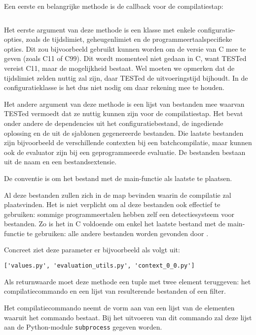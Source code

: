 Een eerste en belangrijke methode is de callback voor de compilatiestap:

\inputminted[firstline=11,lastline=16,gobble=4]{python}{sources/c-config.py}

Het eerste argument van deze methode is een klasse met enkele configuratie-opties, zoals de tijdslimiet, geheugenlimiet en de programmeertaalspecifieke opties.
Dit zou bijvoorbeeld gebruikt kunnen worden om de versie van C mee te geven (zoals C11 of C99).
Dit wordt momenteel niet gedaan in C, want TESTed vereist C11, maar de mogelijkheid bestaat.
Wel moeten we opmerken dat de tijdslimiet zelden nuttig zal zijn, daar TESTed de uitvoeringstijd bijhoudt.
In de configuratieklasse is het dus niet nodig om daar rekening mee te houden.

Het andere argument van deze methode is een lijst van bestanden mee waarvan TESTed vermoedt dat ze nuttig kunnen zijn voor de compilatiestap.
Het bevat onder andere de dependencies uit het configuratiebestand, de ingediende oplossing en de uit de sjablonen gegenereerde bestanden.
Die laatste bestanden zijn bijvoorbeeld de verschillende contexten bij een batchcompilatie, maar kunnen ook de evaluator zijn bij een geprogrammeerde evaluatie.
De bestanden bestaan uit de naam en een bestandsextensie.

De conventie is om het bestand met de main-functie als laatste te plaatsen.

Al deze bestanden zullen zich in de map bevinden waarin de compilatie zal plaatsvinden.
Het is niet verplicht om al deze bestanden ook effectief te gebruiken: sommige programmeertalen hebben zelf een detectiesysteem voor bestanden.
Zo is het in C voldoende om enkel het laatste bestand met de main-functie te gebruiken: alle andere bestanden worden gevonden door .

Concreet ziet deze parameter er bijvoorbeeld als volgt uit:

\begin{verbatim}
['values.py', 'evaluation_utils.py', 'context_0_0.py']
\end{verbatim}

Als returnwaarde moet deze methode een tuple met twee element teruggeven: het compilatiecommando en een lijst van resulterende bestanden of een filter.

Het compilatiecommando neemt de vorm aan van een lijst van de elementen waaruit het commando bestaat.
Bij het uitvoeren van dit commando zal deze lijst aan de Python-module \texttt{subprocess} gegeven worden.

